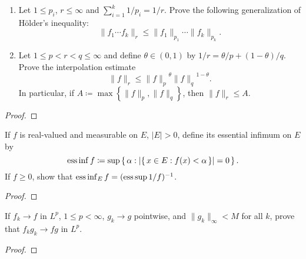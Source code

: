 \begin{problem}
\begin{enumerate}[label=(\alph*),noitemsep]
\item Let $1\leq p_i$, $r\leq\infty$ and $\sum_{i=1}^k1/p_i=1/r$. Prove the
  following generalization of Hölder's inequality:
\[
\|f_1\dotsm f_k\|_r\leq\|f_1\|_{p_1}\dotsm\|f_k\|_{p_k}.
\]
\item Let $1\leq p<r<q\leq\infty$ and define $\theta\in(0,1)$ by
  $1/r=\theta/p+(1-\theta)/q$. Prove the interpolation estimate
\[
\|f\|_r\leq{\|f\|_p}^\theta{\|f\|_q}^{1-\theta}.
\]
In particular, if $A\coloneq\max\left\{\|f\|_p,\|f\|_q\right\}$, then
$\|f\|_r\leq A$.
\end{enumerate}
\end{problem}
\begin{proof}
\end{proof}

\begin{problem}
If $f$ is real-valued and measurable on $E$, $|E|>0$, define its essential
infimum on $E$ by
\[
\operatorname*{ess\,inf} f\coloneq\sup\left\{\,\alpha:|\{\,x\in E:f(x)<\alpha\,\}|=0\,\right\}.
\]
If $f\geq 0$, show that $\operatorname*{ess\,inf}_E f=(\operatorname*{ess\,sup} 1/f)^{-1}$.
\end{problem}
\begin{proof}
\end{proof}

\begin{problem}
If $f_k\to f$ in $L^p$, $1\leq p<\infty$, $g_k\to g$ pointwise, and
$\|g_k\|_\infty<M$ for all $k$, prove that $f_kg_k\to fg$ in $L^p$.
\end{problem}
\begin{proof}
\end{proof}

